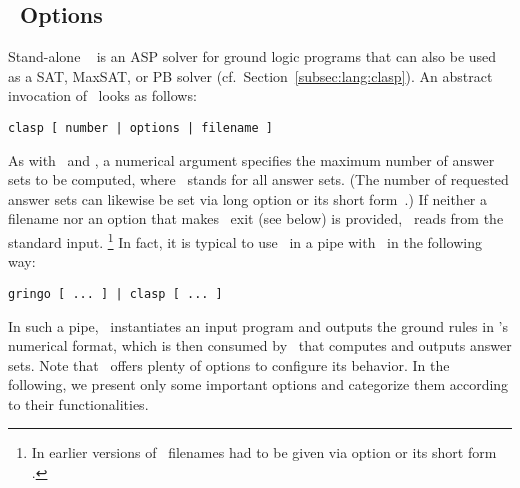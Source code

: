 \subsection{\clasp\ Options}\label{subsec:opt:clasp}
Stand-alone \clasp~\cite{gekanesc07b} is an ASP solver for ground logic programs
that can also be used as a SAT, MaxSAT, or PB solver (cf.\ Section~\ref{subsec:lang:clasp}).
An abstract invocation of \clasp\ looks as follows:
%
\begin{lstlisting}[numbers=none]
clasp [ number | options | filename ]
\end{lstlisting}
%
As with \clingo\ and \iclingo,
a numerical argument specifies the maximum number of answer sets to be computed,
where ~stands for all answer sets.
(The number of requested answer sets can likewise be set via long option
  or its short form~.)
If neither a filename nor an option that makes \clasp\ exit (see below) is provided,
\clasp\ reads from the standard input.%
\footnote{%
 In earlier versions of \clasp\ filenames had to be given via option 
 or its short form .}
In fact, it is typical to use \clasp\ in a pipe with \gringo\ in the following way:
\begin{lstlisting}[numbers=none]
gringo [ ... ] | clasp [ ... ]
\end{lstlisting}
In such a pipe, \gringo\ instantiates an input program and outputs the ground
rules in \smodels's numerical format,
which is then consumed by \clasp\ that computes and outputs answer sets.
Note that \clasp\ offers plenty of options to configure its behavior.
In the following, we present only some important options
and categorize them according to their functionalities.

